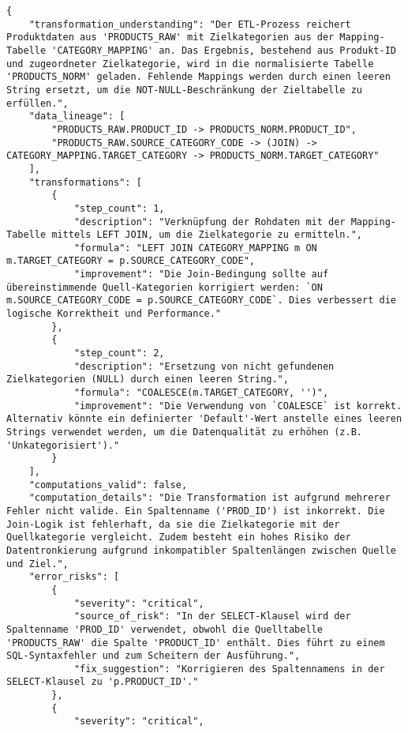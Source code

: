 \begin{lstlisting}[caption={Ausgabe: GEMINI 2.5 Pro Anwendungsfall 6 Hauptdurchlauf},label={gemini_case6_prompt1}]
{
    "transformation_understanding": "Der ETL-Prozess reichert Produktdaten aus 'PRODUCTS_RAW' mit Zielkategorien aus der Mapping-Tabelle 'CATEGORY_MAPPING' an. Das Ergebnis, bestehend aus Produkt-ID und zugeordneter Zielkategorie, wird in die normalisierte Tabelle 'PRODUCTS_NORM' geladen. Fehlende Mappings werden durch einen leeren String ersetzt, um die NOT-NULL-Beschränkung der Zieltabelle zu erfüllen.",
    "data_lineage": [
        "PRODUCTS_RAW.PRODUCT_ID -> PRODUCTS_NORM.PRODUCT_ID",
        "PRODUCTS_RAW.SOURCE_CATEGORY_CODE -> (JOIN) -> CATEGORY_MAPPING.TARGET_CATEGORY -> PRODUCTS_NORM.TARGET_CATEGORY"
    ],
    "transformations": [
        {
            "step_count": 1,
            "description": "Verknüpfung der Rohdaten mit der Mapping-Tabelle mittels LEFT JOIN, um die Zielkategorie zu ermitteln.",
            "formula": "LEFT JOIN CATEGORY_MAPPING m ON m.TARGET_CATEGORY = p.SOURCE_CATEGORY_CODE",
            "improvement": "Die Join-Bedingung sollte auf übereinstimmende Quell-Kategorien korrigiert werden: `ON m.SOURCE_CATEGORY_CODE = p.SOURCE_CATEGORY_CODE`. Dies verbessert die logische Korrektheit und Performance."
        },
        {
            "step_count": 2,
            "description": "Ersetzung von nicht gefundenen Zielkategorien (NULL) durch einen leeren String.",
            "formula": "COALESCE(m.TARGET_CATEGORY, '')",
            "improvement": "Die Verwendung von `COALESCE` ist korrekt. Alternativ könnte ein definierter 'Default'-Wert anstelle eines leeren Strings verwendet werden, um die Datenqualität zu erhöhen (z.B. 'Unkategorisiert')."
        }
    ],
    "computations_valid": false,
    "computation_details": "Die Transformation ist aufgrund mehrerer Fehler nicht valide. Ein Spaltenname ('PROD_ID') ist inkorrekt. Die Join-Logik ist fehlerhaft, da sie die Zielkategorie mit der Quellkategorie vergleicht. Zudem besteht ein hohes Risiko der Datentronkierung aufgrund inkompatibler Spaltenlängen zwischen Quelle und Ziel.",
    "error_risks": [
        {
            "severity": "critical",
            "source_of_risk": "In der SELECT-Klausel wird der Spaltenname 'PROD_ID' verwendet, obwohl die Quelltabelle 'PRODUCTS_RAW' die Spalte 'PRODUCT_ID' enthält. Dies führt zu einem SQL-Syntaxfehler und zum Scheitern der Ausführung.",
            "fix_suggestion": "Korrigieren des Spaltennamens in der SELECT-Klausel zu 'p.PRODUCT_ID'."
        },
        {
            "severity": "critical",

\end{lstlisting}

